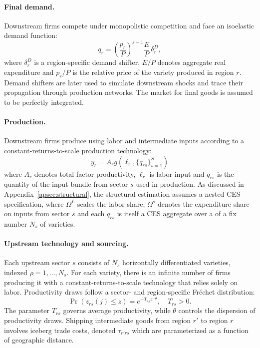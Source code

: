 \paragraph{Final demand.}
Downstream firms compete under monopolistic competition and face an isoelastic demand function:
$$q_{r} = \left(\frac{p_{r}}{P}\right)^{\varepsilon-1}\frac{E}{P}\,\delta_{r}^D,$$
where $\delta_{r}^D$ is a region-specific demand shifter, $E/P$ denotes aggregate real expenditure and $p_{r}/P$ is the relative price of the variety produced in region $r$.
Demand shifters are later used to simulate downstream shocks and trace their propagation through production networks. The market for final goods is assumed to be perfectly integrated.

\paragraph{Production.}
Downstream firms produce using labor and intermediate inputs according to a constant-returns-to-scale production technology:
\begin{equation}
  y_r = A_r g(\ell_r,\{q_{rs}\}_{s=1}^{S})  
\end{equation}
where $A_r$ denotes total factor productivity, $\ell_r$ is labor input and $q_{rs}$ is the quantity of the input bundle from sector $s$ used in production. As discussed in Appendix~\ref{apsec:structural}, the structural estimation assumes a nested CES specification, where $\Omega^L$ scales the labor share, $\Omega^s$ denotes the expenditure share on inputs from sector $s$ and each $q_{rs}$ is itself a CES aggregate over a of a fix number $N_s$ of varieties.

\paragraph{Upstream technology and sourcing.}
Each upstream sector $s$ consists of $N_{s}$ horizontally
differentiated varieties, indexed $\rho=1,\dots,N_{s}$. For each variety, there is an infinite number of firms producing it with a constant-returns-to-scale technology that relies solely on labor. Productivity draws follow a sector- and region-specific Fréchet distribution:
$$\Pr\left(z_{rs}(j) \leq z\right) = e^{-T_{rs}z^{-\theta}}, \quad T_{rs} > 0.$$
The parameter $T_{rs}$ governs average productivity, while $\theta$ controls the dispersion of productivity draws. Shipping intermediate goods from region $r'$ to region $r$ involves iceberg trade costs, denoted $\tau_{r'rs}$ which are parameterized as a function of geographic distance.

